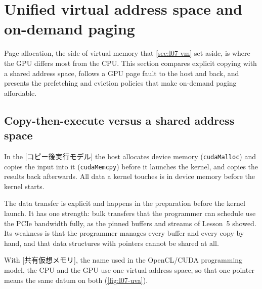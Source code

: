 \documentclass[../main.tex]{subfiles}
\begin{document}
\section{Unified virtual address space and on-demand paging}
\label{sec:l07-uva}

Page allocation, the side of virtual memory that \cref{sec:l07-vm} set
aside, is where the GPU differs most from the CPU.  This section
compares explicit copying with a shared address space, follows a GPU
page fault to the host and back, and presents the prefetching and
eviction policies that make on-demand paging affordable.

\subsection{Copy-then-execute versus a shared address space}

\begin{definition}
  \label{def:l07-copy-then-execute}
  In the [コピー後実行モデル] the host
  allocates device memory (\texttt{cudaMalloc}) and copies the input
  into it (\texttt{cudaMemcpy}) before it launches the kernel, and
  copies the results back afterwards.  All data a kernel touches is in
  device memory before the kernel starts.
\end{definition}

The data transfer is explicit and happens in the preparation before
the kernel launch.  It has one strength: bulk transfers that the
programmer can schedule use the PCIe bandwidth fully, as the pinned
buffers and streams of Lesson~5 showed.  Its weakness is that the
programmer manages every buffer and every copy by hand, and that data
structures with pointers cannot be shared at all.

%
\begin{definition}
  \label{def:l07-svm}
  With [共有仮想メモリ], the name
  used in the OpenCL/CUDA programming model, the CPU and the GPU use
  one virtual address space, so that one pointer means the same datum
  on both (\cref{fig:l07-uva}).
\end{definition}
\end{document}

